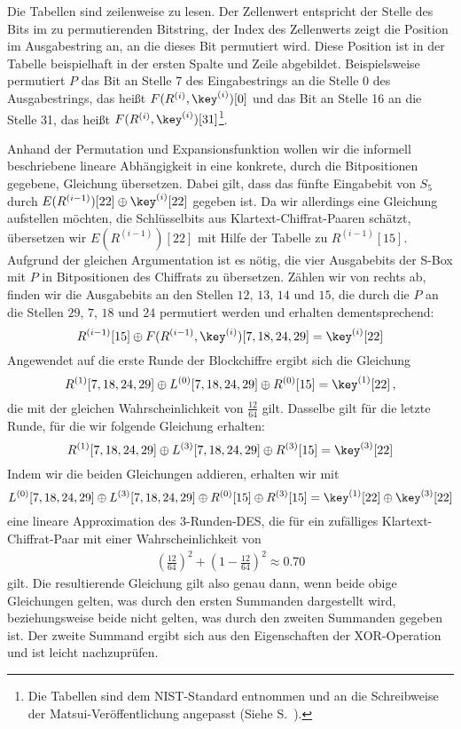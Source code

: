 Die Tabellen sind zeilenweise zu lesen. Der Zellenwert entspricht der
Stelle des Bits im zu permutierenden Bitstring, der Index des
Zellenwerts zeigt die Position im Ausgabestring an, an die dieses Bit
permutiert wird. Diese Position ist in der Tabelle beispielhaft in  der
ersten Spalte und Zeile abgebildet. Beispielsweise permutiert $P$ das
Bit an Stelle 7 des Eingabestrings an die Stelle 0 des Ausgabestrings,
das heißt $F(R^{(i)}, \key^{(i)})[0]$ und das Bit an Stelle 16 an die
Stelle 31, das heißt $F(R^{(i)}, \key^{(i)})[31]$\footnote{Die Tabellen
  sind dem NIST-Standard \cite{NIST_DES99} entnommen und an die
  Schreibweise der Matsui-Veröffentlichung angepasst (Siehe
  S.~\pageref{matsui-notation}).}. 

Anhand der Permutation und Expansionsfunktion wollen wir die informell
beschriebene lineare Abhängigkeit in eine konkrete, durch die
Bitpositionen gegebene, Gleichung übersetzen. Dabei gilt, dass das
fünfte Eingabebit von $S_5$ durch $E(R^{(i-1)})[22] \oplus
\key^{(i)}[22]$ gegeben ist. Da wir allerdings eine Gleichung aufstellen
möchten, die Schlüsselbits aus Klartext-Chiffrat-Paaren schätzt,
übersetzen wir $E(R^{(i-1)})[22]$ mit Hilfe der Tabelle zu
$R^{(i-1)}[15]$. Aufgrund der gleichen Argumentation ist es nötig, die
vier Ausgabebits der S-Box mit $P$ in Bitpositionen des Chiffrats zu
übersetzen. Zählen wir von rechts ab, finden wir die Ausgabebits an den
Stellen $12$, $13$, $14$ und $15$, die durch die $P$ an die Stellen
$29$, $7$, $18$ und $24$ permutiert werden und erhalten dementsprechend: 
\begin{equation}
  R^{(i-1)}[15] \oplus F(R^{(i-1)},\key^{(i)})[7,18,24,29] = \key^{(i)}[22]
  \label{s5relation}
\end{equation}
Angewendet auf die erste Runde der Blockchiffre ergibt sich die Gleichung
\begin{equation*}
  R^{(1)}[7,18,24,29] \oplus L^{(0)}[7,18,24,29] \oplus R^{(0)}[15] = \key^{(1)}[22]\, ,
\end{equation*}
die mit der gleichen Wahrscheinlichkeit von $\frac{12}{64}$
gilt. Dasselbe gilt für die letzte Runde, für die wir folgende Gleichung
erhalten: 
\begin{equation*}
  R^{(1)}[7,18,24,29] \oplus L^{(3)}[7,18,24,29] \oplus R^{(3)}[15] = \key^{(3)}[22]
\end{equation*}
Indem wir die beiden Gleichungen addieren, erhalten wir mit
\begin{equation}
  L^{(0)}[7,18,24,29] \oplus L^{(3)}[7,18,24,29] \oplus R^{(0)}[15] \oplus R^{(3)}[15] = \key^{(1)}[22] \oplus \key^{(3)}[22]
  \label{3roundsapprox}
\end{equation}
eine lineare Approximation des $3$-Runden-DES, die für ein zufälliges
Klartext-Chiffrat-Paar mit einer Wahrscheinlichkeit von 
\begin{align*}
	\left(\frac{12}{64}\right)^{2}+\left(1-\frac{12}{64}\right)^{2} \approx 0.70
\end{align*}
gilt. Die resultierende Gleichung gilt also genau dann, wenn beide obige
Gleichungen gelten, was durch den ersten Summanden dargestellt wird,
beziehungsweise beide nicht gelten, was durch den zweiten Summanden
gegeben ist. Der zweite Summand ergibt sich aus den Eigenschaften der
XOR-Operation und ist leicht nachzuprüfen.

